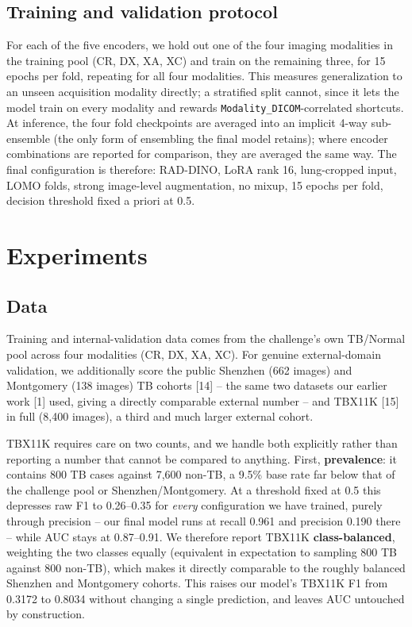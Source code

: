 \documentclass[runningheads]{llncs}
\begin{document}
\subsection{Training and validation protocol}

For each of the five encoders, we hold out one of the four imaging
modalities in the training pool (CR, DX, XA, XC) and train on the remaining
three, for 15 epochs per fold, repeating for all four modalities. This
measures generalization to an unseen acquisition modality directly; a
stratified split cannot, since it lets the model train on every modality
and rewards \texttt{Modality\_DICOM}-correlated shortcuts. At inference,
the four fold checkpoints are averaged into an implicit 4-way sub-ensemble
(the only form of ensembling the final model retains); where encoder
combinations are reported for comparison, they are averaged the same way.
The final configuration is therefore: RAD-DINO, LoRA rank 16, lung-cropped
input, LOMO folds, strong image-level augmentation, no mixup, 15 epochs per
fold, decision threshold fixed a priori at 0.5.

\section{Experiments}

\subsection{Data}
\label{sec:data}

Training and internal-validation data comes from the challenge's own
TB/Normal pool across four modalities (CR, DX, XA, XC). For genuine
external-domain validation, we additionally score the public Shenzhen (662
images) and Montgomery (138 images) TB cohorts [14] -- the same two
datasets our earlier work [1] used, giving a directly comparable
external number -- and TBX11K [15] in full (8{,}400 images), a
third and much larger external cohort.

TBX11K requires care on two counts, and we handle both explicitly rather
than reporting a number that cannot be compared to anything. First,
\textbf{prevalence}: it contains 800 TB cases against 7{,}600 non-TB, a
9.5\% base rate far below that of the challenge pool or
Shenzhen/Montgomery. At a threshold fixed at 0.5 this depresses raw F1 to
0.26--0.35 for \emph{every} configuration we have trained, purely through
precision -- our final model runs at recall 0.961 and precision 0.190 there
-- while AUC stays at 0.87--0.91. We therefore report TBX11K
\textbf{class-balanced}, weighting the two classes equally (equivalent in
expectation to sampling 800 TB against 800 non-TB), which makes it directly
comparable to the roughly balanced Shenzhen and Montgomery cohorts. This
raises our model's TBX11K F1 from 0.3172 to 0.8034 without changing a
single prediction, and leaves AUC untouched by construction.
\end{document}
